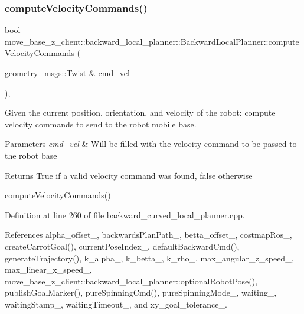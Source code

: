 \subsubsection{\texorpdfstring{compute\+Velocity\+Commands()}{computeVelocityCommands()}}
{\footnotesize\ttfamily \hyperlink{classbool}{bool} move\+\_\+base\+\_\+z\+\_\+client\+::backward\+\_\+local\+\_\+planner\+::\+Backward\+Local\+Planner\+::compute\+Velocity\+Commands (\begin{DoxyParamCaption}\item[{geometry\+\_\+msgs\+::\+Twist \&}]{cmd\+\_\+vel }\end{DoxyParamCaption})\hspace{0.3cm}{\ttfamily [override]}, {\ttfamily [virtual]}}



Given the current position, orientation, and velocity of the robot\+: compute velocity commands to send to the robot mobile base. 


\begin{DoxyParams}{Parameters}
{\em cmd\+\_\+vel} & Will be filled with the velocity command to be passed to the robot base \\
\hline
\end{DoxyParams}
\begin{DoxyReturn}{Returns}
True if a valid velocity command was found, false otherwise
\end{DoxyReturn}
\hyperlink{classmove__base__z__client_1_1backward__local__planner_1_1BackwardLocalPlanner_a8e7dec0bc31856d814d8fa6df747bbb8}{compute\+Velocity\+Commands()} 

Definition at line 260 of file backward\+\_\+curved\+\_\+local\+\_\+planner.\+cpp.



References alpha\+\_\+offset\+\_\+, backwards\+Plan\+Path\+\_\+, betta\+\_\+offset\+\_\+, costmap\+Ros\+\_\+, create\+Carrot\+Goal(), current\+Pose\+Index\+\_\+, default\+Backward\+Cmd(), generate\+Trajectory(), k\+\_\+alpha\+\_\+, k\+\_\+betta\+\_\+, k\+\_\+rho\+\_\+, max\+\_\+angular\+\_\+z\+\_\+speed\+\_\+, max\+\_\+linear\+\_\+x\+\_\+speed\+\_\+, move\+\_\+base\+\_\+z\+\_\+client\+::backward\+\_\+local\+\_\+planner\+::optional\+Robot\+Pose(), publish\+Goal\+Marker(), pure\+Spinning\+Cmd(), pure\+Spinning\+Mode\+\_\+, waiting\+\_\+, waiting\+Stamp\+\_\+, waiting\+Timeout\+\_\+, and xy\+\_\+goal\+\_\+tolerance\+\_\+.


